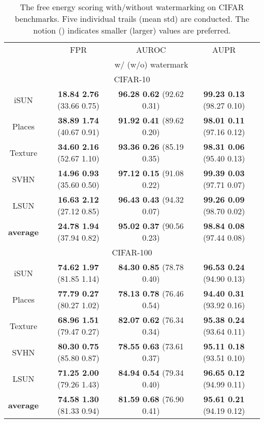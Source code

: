 \documentclass{article}
\begin{document}
\begin{table}[!thp]
\centering
\caption{The free energy scoring with/without watermarking on CIFAR benchmarks. Five individual trails (mean  std) are conducted. The notion  () indicates smaller (larger) values are preferred.} \label{tab: free energy_ms}
\vspace{5pt}
\scriptsize{
\begin{tabular}{c|ccc}
\toprule[1.5pt]
                   & FPR      & AUROC        & AUPR       \\
                   \cline{2-4} 
\multirow{-2}{*}{} & \multicolumn{3}{c}{w/ (w/o) watermark} \\
\midrule[0.6pt]
\multicolumn{4}{c}{\cellcolor{greyL}CIFAR-10} \\
\midrule[0.6pt]
iSUN               & \textbf{18.84  2.76} (33.66  0.75) & \textbf{96.28  0.62} (92.62  0.31) & \textbf{99.23  0.13} (98.27  0.10) \\
Places          & \textbf{38.89  1.74} (40.67  0.91) & \textbf{91.92  0.41} (89.62  0.20) & \textbf{98.01  0.11} (97.16  0.12) \\
Texture            & \textbf{34.60  2.16} (52.67  1.10) & \textbf{93.36  0.26} (85.19  0.35) & \textbf{98.31  0.06} (95.40  0.13) \\
SVHN               & \textbf{14.96  0.93} (35.60  0.50) & \textbf{97.12  0.15} (91.08  0.22) & \textbf{99.39  0.03} (97.71  0.07) \\
LSUN             & \textbf{16.63  2.12} (27.12  0.85) & \textbf{96.43  0.43} (94.32  0.07) & \textbf{99.26  0.09} (98.70  0.02) \\
\midrule
\textbf{average}   & \textbf{24.78  1.94} (37.94  0.82) & \textbf{95.02  0.37} (90.56  0.23) & \textbf{98.84  0.08} (97.44  0.08) \\ \midrule[1pt]
\multicolumn{4}{c}{\cellcolor{greyL}CIFAR-100} \\
\midrule[1pt]
iSUN               & \textbf{74.62  1.97} (81.85  1.14) & \textbf{84.30  0.85} (78.78  0.40) & \textbf{96.53  0.24} (94.90  0.13) \\ 
Places        & \textbf{77.79  0.27} (80.27  1.02) & \textbf{78.13  0.78} (76.46  0.54) & \textbf{94.40  0.31} (93.92  0.16) \\
Texture            & \textbf{68.96  1.51} (79.47  0.27) & \textbf{82.07  0.62} (76.34  0.34) & \textbf{95.38  0.24} (93.64  0.11) \\
SVHN               & \textbf{80.30  0.75} (85.80  0.87) & \textbf{78.55  0.63} (73.61  0.37) & \textbf{95.11  0.18} (93.51  0.10) \\
LSUN             & \textbf{71.25  2.00} (79.26  1.43) & \textbf{84.94  0.54} (79.34  0.40) & \textbf{96.65  0.12} (94.99  0.11) \\
\midrule
\textbf{average}   & \textbf{74.58  1.30} (81.33  0.94) & \textbf{81.59  0.68} (76.90  0.41) & \textbf{95.61  0.21} (94.19  0.12) \\ \bottomrule[1.5pt]      
\end{tabular}
}
\end{table}
\end{document}
